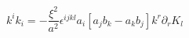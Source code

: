 \begin{equation}
k^{i}k_{i}=-\frac{{\xi}^{2}}{a^{2}}{\epsilon}^{ijkl}a_{i}[a_{j}b_{k}-a_{k}b_{j}]k^{r}{\partial}_{r}K_{l}
\label{22}
\end{equation}

